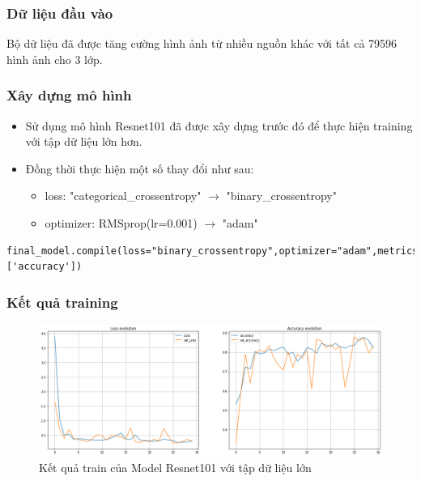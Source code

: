 \subsubsection{Dữ liệu đầu vào }
Bộ dữ liệu đã được tăng cường hình ảnh từ nhiều nguồn khác với tất cả 79596 hình ảnh cho 3 lớp.

\subsubsection{Xây dựng mô hình}
\begin{itemize}
    \item Sử dụng mô hình Resnet101 đã được xây dựng trước đó để thực hiện training với tập dữ liệu lớn hơn.

    \item Đồng thời thực hiện một số thay đổi như sau:
    \begin{itemize}
        \item loss: "categorical\_crossentropy" $\rightarrow$ "binary\_crossentropy"
        
        \item optimizer: RMSprop(lr=0.001) $\rightarrow$ "adam"
    \end{itemize}
    
\end{itemize}
\begin{lstlisting}
final_model.compile(loss="binary_crossentropy",optimizer="adam",metrics=['accuracy'])
\end{lstlisting}


\subsubsection{Kết quả training}
\begin{center}
    \begin{figure}[!h]
        \centering
        \includegraphics[scale = 0.38]{fileanh/Resnet_increase.png}
        \caption{Kết quả train của Model Resnet101 với tập dữ liệu lớn}
    \end{figure}
\end{center}
